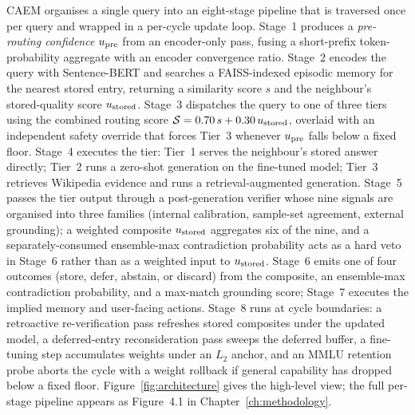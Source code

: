 CAEM organises a single query into an eight-stage pipeline that is traversed once per query and wrapped in a per-cycle update loop. Stage~1 produces a \textit{pre-routing confidence} $u_{\text{pre}}$ from an encoder-only pass, fusing a short-prefix token-probability aggregate with an encoder convergence ratio. Stage~2 encodes the query with Sentence-BERT and searches a FAISS-indexed episodic memory for the nearest stored entry, returning a similarity score $s$ and the neighbour's stored-quality score $u_{\text{stored}}$. Stage~3 dispatches the query to one of three tiers using the combined routing score $\mathcal{S} = 0.70\,s + 0.30\,u_{\text{stored}}$, overlaid with an independent safety override that forces Tier~3 whenever $u_{\text{pre}}$ falls below a fixed floor. Stage~4 executes the tier: Tier~1 serves the neighbour's stored answer directly; Tier~2 runs a zero-shot generation on the fine-tuned model; Tier~3 retrieves Wikipedia evidence and runs a retrieval-augmented generation. Stage~5 passes the tier output through a post-generation verifier whose nine signals are organised into three families (internal calibration, sample-set agreement, external grounding); a weighted composite $u_{\text{stored}}$ aggregates six of the nine, and a separately-consumed ensemble-max contradiction probability acts as a hard veto in Stage~6 rather than as a weighted input to $u_{\text{stored}}$. Stage~6 emits one of four outcomes (store, defer, abstain, or discard) from the composite, an ensemble-max contradiction probability, and a max-match grounding score; Stage~7 executes the implied memory and user-facing actions. Stage~8 runs at cycle boundaries: a retroactive re-verification pass refreshes stored composites under the updated model, a deferred-entry reconsideration pass sweeps the deferred buffer, a fine-tuning step accumulates weights under an $L_2$ anchor, and an MMLU retention probe aborts the cycle with a weight rollback if general capability has dropped below a fixed floor. Figure~\ref{fig:architecture} gives the high-level view; the full per-stage pipeline appears as Figure~4.1 in Chapter~\ref{ch:methodology}.

